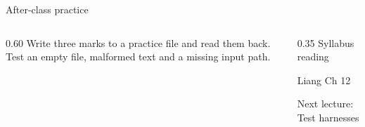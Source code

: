 \documentclass[10pt,aspectratio=169]{beamer}
\begin{document}
\begin{frame}[fragile,t]{After-class practice}
\begin{columns}[T,onlytextwidth]\begin{column}{0.60\textwidth}
Write three marks to a practice file and read them back. Test an empty file, malformed text and a missing input path.
\end{column}\begin{column}{0.35\textwidth}\small
Syllabus reading\par Liang Ch 12

Next lecture: Test harnesses
\end{column}\end{columns}
\end{frame}
\end{document}

